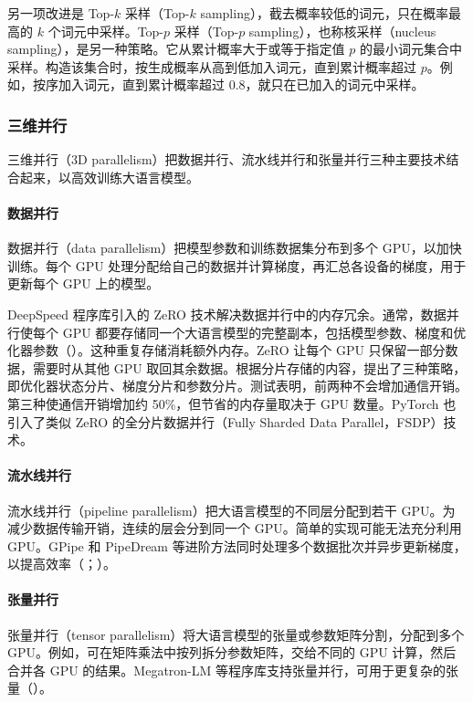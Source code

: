\begin{practicaltip}
另一项改进是 Top-$k$ 采样（Top-$k$ sampling），截去概率较低的词元，只在概率最高的 $k$ 个词元中采样。Top-$p$ 采样（Top-$p$ sampling），也称核采样（nucleus sampling），是另一种策略。它从累计概率大于或等于指定值 $p$ 的最小词元集合中采样。构造该集合时，按生成概率从高到低加入词元，直到累计概率超过 $p$。例如，按序加入词元，直到累计概率超过 0.8，就只在已加入的词元中采样。
\end{practicaltip}

\subsubsection{三维并行}
三维并行（3D parallelism）把数据并行、流水线并行和张量并行三种主要技术结合起来，以高效训练大语言模型。

\paragraph*{数据并行}
数据并行（data parallelism）把模型参数和训练数据集分布到多个 GPU，以加快训练。每个 GPU 处理分配给自己的数据并计算梯度，再汇总各设备的梯度，用于更新每个 GPU 上的模型。

\begin{practicaltip}
DeepSpeed 程序库引入的 ZeRO 技术解决数据并行中的内存冗余。通常，数据并行使每个 GPU 都要存储同一个大语言模型的完整副本，包括模型参数、梯度和优化器参数（）。这种重复存储消耗额外内存。ZeRO 让每个 GPU 只保留一部分数据，需要时从其他 GPU 取回其余数据。根据分片存储的内容，提出了三种策略，即优化器状态分片、梯度分片和参数分片。测试表明，前两种不会增加通信开销。第三种使通信开销增加约 50\%，但节省的内存量取决于 GPU 数量。PyTorch 也引入了类似 ZeRO 的全分片数据并行（Fully Sharded Data Parallel，FSDP）技术。
\end{practicaltip}

\paragraph*{流水线并行}
流水线并行（pipeline parallelism）把大语言模型的不同层分配到若干 GPU。为减少数据传输开销，连续的层会分到同一个 GPU。简单的实现可能无法充分利用 GPU。GPipe 和 PipeDream 等进阶方法同时处理多个数据批次并异步更新梯度，以提高效率（；）。

\paragraph*{张量并行}
张量并行（tensor parallelism）将大语言模型的张量或参数矩阵分割，分配到多个 GPU。例如，可在矩阵乘法中按列拆分参数矩阵，交给不同的 GPU 计算，然后合并各 GPU 的结果。Megatron-LM 等程序库支持张量并行，可用于更复杂的张量（）。
